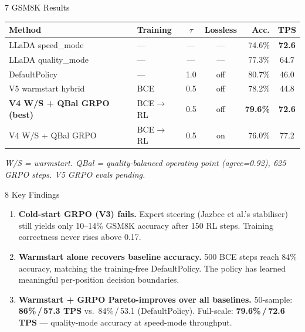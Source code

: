 \documentclass[final]{beamer}
\newlength{\colsep}   \setlength{\colsep}{0.7cm}
\newlength{\colwidth} \setlength{\colwidth}{0.306\paperwidth}
\begin{document}
\begin{frame}[t]
\begin{columns}[t]
\begin{column}{\colwidth}
\begin{block}{7 \quad GSM8K Results}
\vspace{0.35cm}
\begin{center}
\setlength{\tabcolsep}{5pt}
\renewcommand{\arraystretch}{1.4}
\begin{tabular}{llccrc}
\toprule
\textbf{Method} & \textbf{Training} & $\tau$ & \textbf{Lossless} &
  \textbf{Acc.} & \textbf{TPS} \\
\midrule
LLaDA speed\_mode   & —           & — & — & 74.6\% & \textbf{72.6} \\
LLaDA quality\_mode & —           & — & — & 77.3\% & 64.7 \\
DefaultPolicy       & —           & 1.0 & off & 80.7\% & 46.0 \\
\midrule
V5 warmstart hybrid & BCE & 0.5 & off & 78.2\% & 44.8 \\
\rowcolor{highlightyellow}
\textbf{V4 W/S + QBal GRPO (best)} & BCE$\to$RL & 0.5 & off &
  \textbf{79.6\%} & \textbf{72.6} \\
V4 W/S + QBal GRPO & BCE$\to$RL & 0.5 & on  & 76.0\% & 77.2 \\
\bottomrule
\end{tabular}
\end{center}

{\small\textit{W/S = warmstart. QBal = quality-balanced operating point
(agree=0.92), 625 GRPO steps. V5 GRPO evals pending.}}

\end{block}

\begin{block}{8 \quad Key Findings}
\begin{enumerate}\itemsep6pt
  \item \textbf{Cold-start GRPO (V3) fails.}
        Expert steering (Jazbec et al.'s stabiliser) still yields
        only 10--14\% GSM8K accuracy after 150 RL steps.
        Training correctness never rises above 0.17.

  \item \textbf{Warmstart alone recovers baseline accuracy.}
        500 BCE steps reach 84\% accuracy, matching the training-free
        DefaultPolicy. The policy has learned meaningful per-position
        decision boundaries.

  \item \textbf{Warmstart + GRPO Pareto-improves over all baselines.}
        50-sample: \textbf{86\%\,/\,57.3 TPS} vs.\
        84\%\,/\,53.1 (DefaultPolicy).
        Full-scale: \textbf{79.6\%\,/\,72.6 TPS} ---
        quality-mode accuracy at speed-mode throughput.


\end{enumerate}
\end{block}
\end{column}
\end{columns}
\end{frame}
\end{document}
